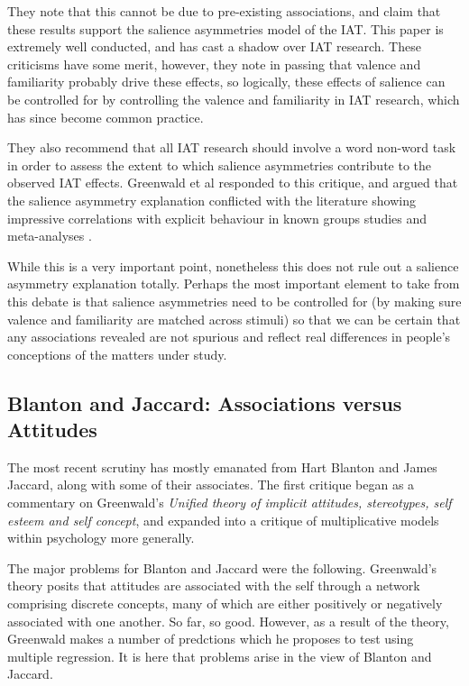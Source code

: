 They note that this cannot be due to pre-existing associations, and claim that these results support the salience asymmetries model of the IAT. This paper is extremely well conducted, and has  cast a shadow over  IAT research. These criticisms have some merit, however, they note in passing that valence and familiarity probably drive these effects, so logically, these effects of salience can be controlled for by controlling the valence and familiarity in IAT research, which has since become common practice. 

They also recommend that all IAT research should involve a word non-word task in order to assess the extent to which salience asymmetries contribute to the observed IAT effects. Greenwald  et al \cite{Greenwald2005} responded to this critique, and argued that the salience asymmetry explanation conflicted with the literature showing impressive correlations with explicit behaviour in known groups studies and meta-analyses \cite{Greenwald2009}. 

While this is a very important point, nonetheless this does not rule out a salience asymmetry explanation totally. Perhaps the most important element to take from this debate is that salience asymmetries need to be controlled for (by making sure valence and familiarity are matched across stimuli) so that we can be certain that any associations revealed are not spurious and reflect real differences in people's conceptions of the matters under study. 

\subsection{Blanton and Jaccard: Associations versus Attitudes}
\label{sec:blant-jacc-assoc}

The most recent scrutiny has mostly emanated from Hart Blanton and James Jaccard, along with some of their associates. The first critique began as a commentary on Greenwald's \cite{greenwald2002}  \textit{Unified theory of implicit attitudes, stereotypes, self esteem and self concept}, and expanded into a critique of multiplicative models within psychology more generally. 

The major problems for Blanton and Jaccard \cite{Blanton2006a} were the following. Greenwald's theory posits that attitudes are associated with the self through a network comprising discrete concepts, many of which are either positively or negatively associated with one another. So far, so good. However, as a result of the theory, Greenwald makes a number of predctions which he proposes to test using multiple regression. It is here that problems arise in the view of Blanton and Jaccard. 

